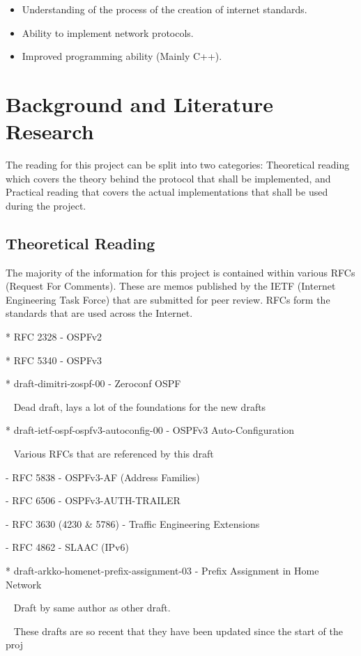 \documentclass[12pt]{report}
\begin{document}
\begin{itemize}
	\item Understanding of the process of the creation of internet standards.
	\item Ability to implement network protocols. 
	\item Improved programming ability (Mainly C++).
\end{itemize}

\chapter{Background and Literature Research}

The reading for this project can be split into two categories:
Theoretical reading which covers the theory behind the protocol that 
shall be implemented, and Practical reading that covers the actual implementations
that shall be used during the project.

\section{Theoretical Reading}
The majority of the information for this project is contained within various RFCs (Request For Comments).
These are memos published by the IETF (Internet Engineering Task Force) that are submitted for peer review.
RFCs form the standards that are used across the Internet.

	* RFC 2328 - OSPFv2 

	* RFC 5340 - OSPFv3

	* draft-dimitri-zospf-00 - Zeroconf OSPF

		~ Dead draft, lays a lot of the foundations for the new drafts

	* draft-ietf-ospf-ospfv3-autoconfig-00 - OSPFv3 Auto-Configuration 

		~ Various RFCs that are referenced by this draft
			
			- RFC 5838 - OSPFv3-AF (Address Families)
			
			- RFC 6506 - OSPFv3-AUTH-TRAILER
			
			- RFC 3630 (4230 \& 5786) - Traffic Engineering Extensions
			
			- RFC 4862 - SLAAC (IPv6)

	* draft-arkko-homenet-prefix-assignment-03 - Prefix Assignment in Home Network
 		
		~ Draft by same author as other draft.
 		
		~ These drafts are so recent that they have been updated since the start of the proj
\end{document}
